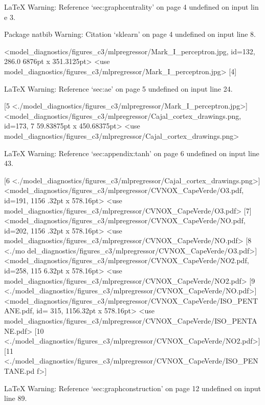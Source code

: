 LaTeX Warning: Reference `sec:graphcentrality' on page 4 undefined on input lin
e 3.


Package natbib Warning: Citation `sklearn' on page 4 undefined on input line 8.



<model_diagnostics/figures_c3/mlpregressor/Mark_I_perceptron.jpg, id=132, 286.0
6876pt x 351.3125pt>
<use model_diagnostics/figures_c3/mlpregressor/Mark_I_perceptron.jpg> [4]

LaTeX Warning: Reference `sec:ae' on page 5 undefined on input line 24.

[5 <./model_diagnostics/figures_c3/mlpregressor/Mark_I_perceptron.jpg>]
<model_diagnostics/figures_c3/mlpregressor/Cajal_cortex_drawings.png, id=173, 7
59.83875pt x 450.68375pt>
<use model_diagnostics/figures_c3/mlpregressor/Cajal_cortex_drawings.png>

LaTeX Warning: Reference `sec:appendix:tanh' on page 6 undefined on input line 
43.

[6 <./model_diagnostics/figures_c3/mlpregressor/Cajal_cortex_drawings.png>]
<model_diagnostics/figures_c3/mlpregressor/CVNOX_CapeVerde/O3.pdf, id=191, 1156
.32pt x 578.16pt>
<use model_diagnostics/figures_c3/mlpregressor/CVNOX_CapeVerde/O3.pdf> [7]
<model_diagnostics/figures_c3/mlpregressor/CVNOX_CapeVerde/NO.pdf, id=202, 1156
.32pt x 578.16pt>
<use model_diagnostics/figures_c3/mlpregressor/CVNOX_CapeVerde/NO.pdf> [8 <./mo
del_diagnostics/figures_c3/mlpregressor/CVNOX_CapeVerde/O3.pdf>]
<model_diagnostics/figures_c3/mlpregressor/CVNOX_CapeVerde/NO2.pdf, id=258, 115
6.32pt x 578.16pt>
<use model_diagnostics/figures_c3/mlpregressor/CVNOX_CapeVerde/NO2.pdf>
[9 <./model_diagnostics/figures_c3/mlpregressor/CVNOX_CapeVerde/NO.pdf>]
<model_diagnostics/figures_c3/mlpregressor/CVNOX_CapeVerde/ISO_PENTANE.pdf, id=
315, 1156.32pt x 578.16pt>
<use model_diagnostics/figures_c3/mlpregressor/CVNOX_CapeVerde/ISO_PENTANE.pdf>
[10 <./model_diagnostics/figures_c3/mlpregressor/CVNOX_CapeVerde/NO2.pdf>]
[11 <./model_diagnostics/figures_c3/mlpregressor/CVNOX_CapeVerde/ISO_PENTANE.pd
f>]

LaTeX Warning: Reference `sec:graphconstruction' on page 12 undefined on input 
line 89.

